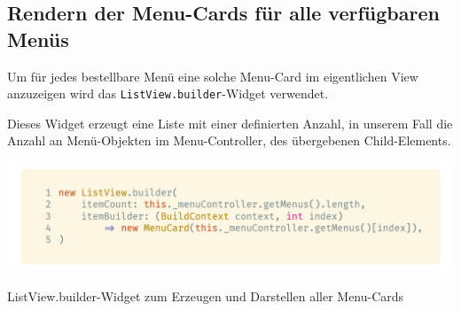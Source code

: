 \subsection{Rendern der Menu-Cards für alle verfügbaren Menüs}

Um für jedes bestellbare Menü eine solche Menu-Card im eigentlichen View anzuzeigen
wird das \lstinline{ListView.builder}-Widget verwendet.

Dieses Widget erzeugt eine Liste mit einer definierten Anzahl, in unserem Fall
die Anzahl an Menü-Objekten im Menu-Controller, des übergebenen Child-Elements.

\begin{code}[H]
    \centering
    \includegraphics[width=1\textwidth]{images/Client/views/menuview/menuListViewBuilder.png}
    \vspace{-25pt}
    \caption{ListView.builder-Widget zum Erzeugen und Darstellen aller Menu-Cards}
\end{code}

\newpage